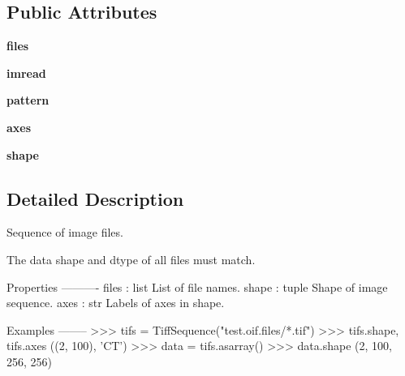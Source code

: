 \subsection*{Public Attributes}
\begin{DoxyCompactItemize}
\item 
\hypertarget{classtifffile_1_1TiffSequence_a734d6dfdbfbdc2d26c59e7413e9f78d4}{{\bfseries files}}\label{classtifffile_1_1TiffSequence_a734d6dfdbfbdc2d26c59e7413e9f78d4}

\item 
\hypertarget{classtifffile_1_1TiffSequence_a656d87f405cb67c7744470bef749c09d}{{\bfseries imread}}\label{classtifffile_1_1TiffSequence_a656d87f405cb67c7744470bef749c09d}

\item 
\hypertarget{classtifffile_1_1TiffSequence_a3ced8e56728d8dc84b95cd0e28dd8b29}{{\bfseries pattern}}\label{classtifffile_1_1TiffSequence_a3ced8e56728d8dc84b95cd0e28dd8b29}

\item 
\hypertarget{classtifffile_1_1TiffSequence_af80218f30eebb11ff3054df126b5e800}{{\bfseries axes}}\label{classtifffile_1_1TiffSequence_af80218f30eebb11ff3054df126b5e800}

\item 
\hypertarget{classtifffile_1_1TiffSequence_ae581d8715f29b3c6d03df21d139d68c9}{{\bfseries shape}}\label{classtifffile_1_1TiffSequence_ae581d8715f29b3c6d03df21d139d68c9}

\end{DoxyCompactItemize}


\subsection{Detailed Description}
\begin{DoxyVerb}Sequence of image files.

The data shape and dtype of all files must match.

Properties
----------
files : list
    List of file names.
shape : tuple
    Shape of image sequence.
axes : str
    Labels of axes in shape.

Examples
--------
>>> tifs = TiffSequence("test.oif.files/*.tif")
>>> tifs.shape, tifs.axes
((2, 100), 'CT')
>>> data = tifs.asarray()
>>> data.shape
(2, 100, 256, 256)\end{DoxyVerb}
 

